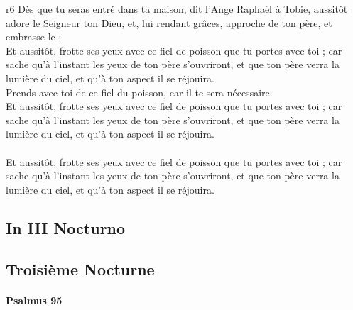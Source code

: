 \documentclass[twoside]{article}
\begin{document}
\begin{paracol}[1]{2}
{	}
	{r6}
	{\vfill
	\rr Dès que tu seras entré dans ta maison, dit l’Ange Raphaël à Tobie, aussitôt adore le Seigneur ton Dieu, et, lui rendant grâces, approche de ton père, et embrasse-le :\\
	\GreSpecial{*} Et aussitôt, frotte ses yeux avec ce fiel de poisson que tu portes avec toi ; car sache qu’à l’instant les yeux de ton père s’ouvriront, et que ton père verra la lumière du ciel, et qu’à ton aspect il se réjouira.\\
	\vv Prends avec toi de ce fiel du poisson, car il te sera nécessaire.\\
	\GreSpecial{*} Et aussitôt, frotte ses yeux avec ce fiel de poisson que tu portes avec toi ; car sache qu’à l’instant les yeux de ton père s’ouvriront, et que ton père verra la lumière du ciel, et qu’à ton aspect il se réjouira.\\
	\versetGloireAuPere{}\\
	\GreSpecial{*} Et aussitôt, frotte ses yeux avec ce fiel de poisson que tu portes avec toi ; car sache qu’à l’instant les yeux de ton père s’ouvriront, et que ton père verra la lumière du ciel, et qu’à ton aspect il se réjouira.\vfill\newpage\null\newpage}

\subsection{In III Nocturno}

\switchcolumn

\subsection{Troisième Nocturne}

\switchcolumn*

\paragraph{Psalmus 95}



\end{paracol}
\end{document}
